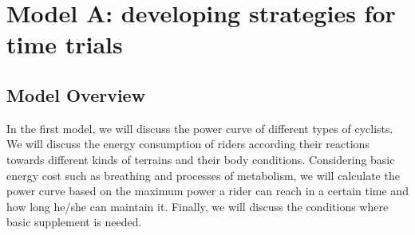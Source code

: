 \documentclass{article}
\begin{document}
	\section{Model A: developing strategies for time trials}
		\subsection{Model Overview}
			In the first model, we will discuss the power curve of different types of cyclists. We will discuss the energy consumption of riders according their reactions towards different kinds of terrains and their body conditions. Considering basic energy cost such as breathing and processes of metabolism, we will calculate the power curve based on the maximum power a rider can reach in a certain time and how long he/she can maintain it. Finally, we will discuss the conditions where basic supplement is needed.
\end{document}
